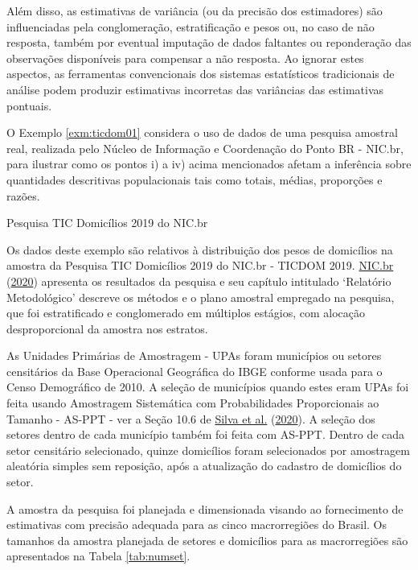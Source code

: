 \documentclass[
  12pt,
  brazilian,
]{book}
\theoremstyle{definition}
\theoremstyle{definition}
\theoremstyle{definition}
\theoremstyle{definition}
\theoremstyle{remark}
\begin{document}
Além disso, as estimativas de variância (ou da precisão dos estimadores) são influenciadas pela conglomeração, estratificação e pesos ou, no caso de não resposta, também por eventual imputação de dados faltantes ou reponderação das observações disponíveis para compensar a não resposta. Ao ignorar estes aspectos, as ferramentas convencionais dos sistemas estatísticos tradicionais de análise podem produzir estimativas incorretas das variâncias das estimativas pontuais.

O Exemplo \ref{exm:ticdom01} considera o uso de dados de uma pesquisa amostral real, realizada pelo Núcleo de Informação e Coordenação do Ponto BR - NIC.br, para ilustrar como os pontos i) a iv) acima mencionados afetam a inferência sobre quantidades descritivas populacionais tais como
totais, médias, proporções e razões.

\textbf{\label{exm:ticdom01}} Pesquisa TIC Domicílios 2019 do NIC.br

Os dados deste exemplo são relativos à distribuição dos pesos de domicílios na amostra da Pesquisa TIC Domicílios 2019 do NIC.br - TICDOM 2019. \protect\hyperlink{ref-NICbr2020a}{NIC.br} (\protect\hyperlink{ref-NICbr2020a}{2020}) apresenta os resultados da pesquisa e seu capítulo intitulado `Relatório Metodológico' descreve os métodos e o plano amostral empregado na pesquisa, que foi estratificado e conglomerado em múltiplos estágios, com alocação desproporcional da amostra nos estratos.

As Unidades Primárias de Amostragem - UPAs foram municípios ou setores censitários da Base Operacional Geográfica do IBGE conforme usada para o Censo Demográfico de 2010. A seleção de municípios quando estes eram UPAs foi feita usando Amostragem Sistemática com Probabilidades Proporcionais ao Tamanho - AS-PPT - ver a Seção 10.6 de \protect\hyperlink{ref-Silva2020}{Silva et al.} (\protect\hyperlink{ref-Silva2020}{2020}). A seleção dos setores dentro de cada município também foi feita com AS-PPT. Dentro de cada setor censitário selecionado, quinze domicílios foram selecionados por amostragem aleatória simples sem reposição, após a atualização do cadastro de domicílios do setor.

A amostra da pesquisa foi planejada e dimensionada visando ao fornecimento de estimativas com precisão adequada para as cinco macrorregiões do Brasil. Os tamanhos da amostra planejada de setores e domicílios para as macrorregiões são apresentados na Tabela \ref{tab:numset}.
\end{document}
